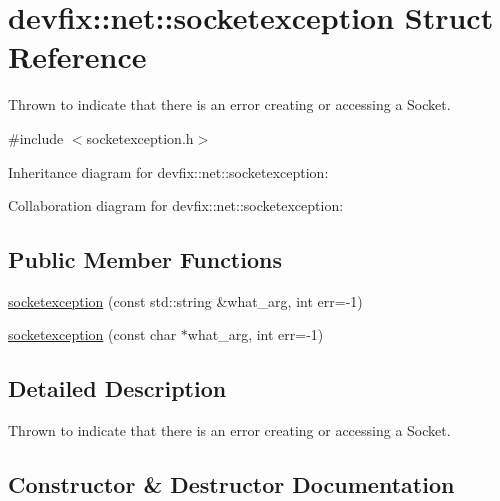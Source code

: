 \hypertarget{structdevfix_1_1net_1_1socketexception}{}\section{devfix\+:\+:net\+:\+:socketexception Struct Reference}
\label{structdevfix_1_1net_1_1socketexception}


Thrown to indicate that there is an error creating or accessing a Socket.  




{\ttfamily \#include $<$socketexception.\+h$>$}



Inheritance diagram for devfix\+:\+:net\+:\+:socketexception\+:


Collaboration diagram for devfix\+:\+:net\+:\+:socketexception\+:
\subsection*{Public Member Functions}
\begin{DoxyCompactItemize}
\item 
\hyperlink{structdevfix_1_1net_1_1socketexception_aeab5d004d494103b37156a5f23a5296a}{socketexception} (const std\+::string \&what\+\_\+arg, int err=-\/1)
\item 
\hyperlink{structdevfix_1_1net_1_1socketexception_a6da69f635eb11f932a0e960545d023bd}{socketexception} (const char $\ast$what\+\_\+arg, int err=-\/1)
\end{DoxyCompactItemize}


\subsection{Detailed Description}
Thrown to indicate that there is an error creating or accessing a Socket. 

\subsection{Constructor \& Destructor Documentation}
\mbox{\label{structdevfix_1_1net_1_1socketexception_aeab5d004d494103b37156a5f23a5296a}} 

